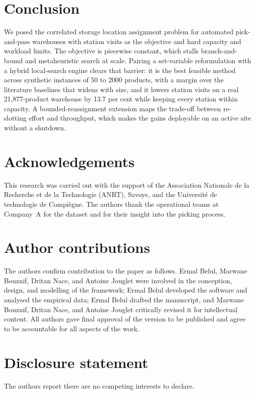 \documentclass[]{interact}
\begin{document}
\section{Conclusion}\label{sec:conclusion}
We posed the correlated storage location assignment problem for automated pick-and-pass warehouses with station visits as the objective and hard capacity and workload limits. The objective is piecewise constant, which stalls branch-and-bound and metaheuristic search at scale. Pairing a set-variable reformulation with a hybrid local-search engine clears that barrier: it is the best feasible method across synthetic instances of 50 to 2000 products, with a margin over the literature baselines that widens with size, and it lowers station visits on a real 21,877-product warehouse by 13.7 per cent while keeping every station within capacity. A bounded-reassignment extension maps the trade-off between re-slotting effort and throughput, which makes the gains deployable on an active site without a shutdown.

\section*{Acknowledgements}
This research was carried out with the support of the Association Nationale de la Recherche et de la Technologie (ANRT), Savoye, and the Universit\'{e} de technologie de Compi\`{e}gne. The authors thank the operational teams at Company~A for the dataset and for their insight into the picking process.

\section*{Author contributions}
The authors confirm contribution to the paper as follows. Ermal Belul, Marwane Bouznif, Dritan Nace, and Antoine Jouglet were involved in the conception, design, and modelling of the framework; Ermal Belul developed the software and analysed the empirical data; Ermal Belul drafted the manuscript, and Marwane Bouznif, Dritan Nace, and Antoine Jouglet critically revised it for intellectual content. All authors gave final approval of the version to be published and agree to be accountable for all aspects of the work.

\section*{Disclosure statement}
The authors report there are no competing interests to declare.
\end{document}
